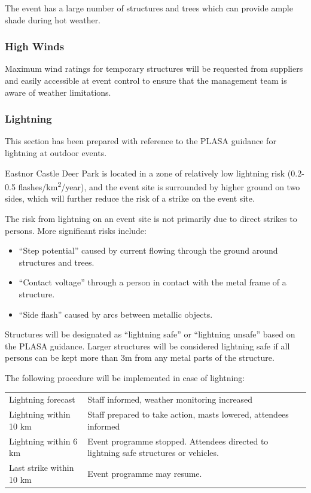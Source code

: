 The event has a large number of structures and trees which can provide ample shade during
hot weather.

\subsubsection{High Winds}

Maximum wind ratings for temporary structures will be requested from suppliers and
easily accessible at event control to ensure that the management team is aware of weather
limitations.

\subsubsection{Lightning}

This section has been prepared with reference to the PLASA guidance for lightning at
outdoor events\cite{plasalightning}.

Eastnor Castle Deer Park is located in a zone of relatively low lightning risk (0.2-0.5
flashes/km\textsuperscript{2}/year\cite{pd62305-2}), and the event site is surrounded by
higher ground on two sides, which will further reduce the risk of a strike on the event site.

The risk from lightning on an event site is not primarily due to direct strikes to persons.
More significant risks include:

\begin{itemize}
    \tightlist
    \item ``Step potential'' caused by current flowing through the ground around structures and trees.
    \item ``Contact voltage'' through a person in contact with the metal frame of a structure.
    \item ``Side flash'' caused by arcs between metallic objects.
\end{itemize}

Structures will be designated as ``lightning safe'' or ``lightning unsafe'' based on the PLASA guidance.
Larger structures will be considered lightning safe if all persons can be kept more than 3m from any metal
parts of the structure.

The following procedure will be implemented in case of lightning:

\begin{tabular}{| l | l |}
    \hline
    Lightning forecast       & Staff informed, weather monitoring increased                                          \\
    Lightning within 10 km   & Staff prepared to take action, masts lowered, attendees informed                      \\
    Lightning within 6 km    & Event programme stopped. Attendees directed to lightning safe structures or vehicles. \\
    Last strike within 10 km & Event programme may resume.                                                           \\
    \hline
\end{tabular}

